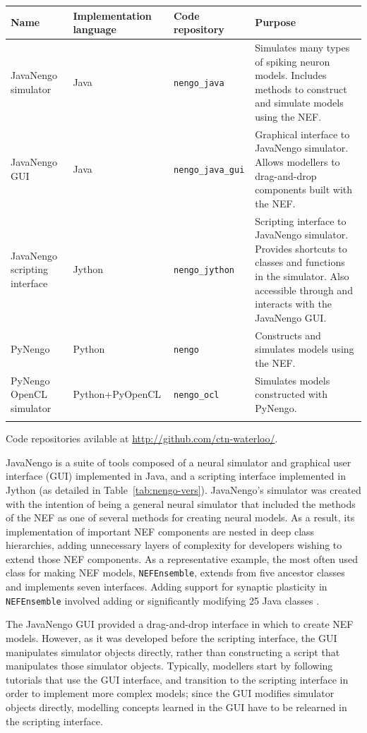 \documentclass{frontiersSCNS}
\begin{document}
\begin{table}[!t]
{\begin{tabular}{p{2.6cm} p{2.7cm} l p{7cm}} \toprule
\textbf{Name} & \textbf{Implementation language}
  & \textbf{Code repository} & \textbf{Purpose} \\\midrule
JavaNengo simulator & Java & \texttt{nengo\_java}
  & Simulates many types of spiking neuron models.
  Includes methods to construct and simulate models using the NEF. \\
JavaNengo GUI & Java & \texttt{nengo\_java\_gui}
  & Graphical interface to JavaNengo simulator.
  Allows modellers to drag-and-drop components built with the NEF. \\
JavaNengo scripting interface & Jython & \texttt{nengo\_jython}
  & Scripting interface to JavaNengo simulator.
  Provides shortcuts to classes and functions in the simulator.
  Also accessible through and interacts with the JavaNengo GUI. \\
PyNengo & Python & \texttt{nengo}
  & Constructs and simulates models using the NEF. \\
PyNengo OpenCL simulator & Python+PyOpenCL
  & \texttt{nengo\_ocl}
  & Simulates models constructed with PyNengo. \\\botrule
\end{tabular}}{Code repositories avilable at \url{http://github.com/ctn-waterloo/}.}
\end{table}

JavaNengo is a suite of tools composed of
a neural simulator and graphical user interface (GUI)
implemented in Java,
and a scripting interface implemented in Jython
(as detailed in Table~\ref{tab:nengo-vers}).
JavaNengo's simulator was created
with the intention of being a general
neural simulator that included
the methods of the NEF
as one of several
methods for creating neural models.
As a result, its implementation
of important NEF components
are nested in deep class hierarchies,
adding unnecessary layers of complexity
for developers wishing
to extend those NEF components.
As a representative example,
the most often used class for making
NEF models, \texttt{NEFEnsemble},
extends from five ancestor classes
and implements seven interfaces.
Adding support for synaptic plasticity
in \texttt{NEFEnsemble}
involved adding or significantly modifying
25 Java classes \cite{TODO}.

The JavaNengo GUI provided
a drag-and-drop interface in which to create NEF models.
However, as it was developed
before the scripting interface,
the GUI manipulates simulator objects directly,
rather than constructing a script
that manipulates those simulator objects.
Typically, modellers start by following
tutorials that use the GUI interface,
and transition to the scripting interface
in order to implement more complex models;
since the GUI modifies simulator objects directly,
modelling concepts learned in the GUI
have to be relearned in the scripting interface.
\end{document}
